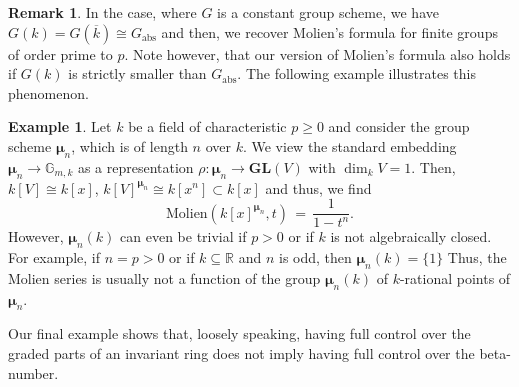 \documentclass[reqno]{amsart}
\newcommand{\RR}{{\mathbb{R}}}
\newcommand{\GG}{{\mathbb{G}}}
\newcommand{\GL}{{\mathbf{GL}}}
\newcommand{\bmu}{\boldsymbol{\mu}}
\theoremstyle{definition}
\newtheorem{Example}[Definition]{Example}
\newtheorem{Remark}[Definition]{Remark}
\theoremstyle{plain}
\begin{document}
\begin{Remark}
\label{rem: molien}
In the case, where $G$ is a constant group scheme,
we have $G(k)=G(\overline{k})\cong G_{\mathrm{abs}}$ and then, 
we recover Molien's formula for finite groups of order prime to $p$.
Note however, that our version of Molien's formula also holds
if $G(k)$ is strictly smaller than $G_{\mathrm{abs}}$.
The following example illustrates this phenomenon.
\end{Remark}

\begin{Example}
\label{ex: molien}
Let $k$ be a field of characteristic $p\geq0$
and consider the group scheme $\bmu_n$, which is of length $n$ over $k$.
We view the standard embedding $\bmu_n\to\GG_{m,k}$
as a representation $\rho:\bmu_n\to\GL(V)$ with $\dim_kV=1$.
Then, $k[V]\cong k[x]$, $k[V]^{\bmu_n}\cong k[x^n]\subset k[x]$ 
and thus, we find
$$
\mathrm{Molien}\left(k[x]^{\bmu_n},t\right) \,=\,\frac{1}{1-t^n}.
$$
However, $\bmu_n(k)$ can even be trivial 
if $p>0$ or if $k$ is not algebraically closed.
For example, if $n=p>0$ or if $k\subseteq\RR$ and $n$ is odd, then $\bmu_n(k)=\{1\}$
Thus, the Molien series is usually not a function of the group $\bmu_n(k)$
of $k$-rational points of $\bmu_n$. 
\end{Example}

Our final example shows that, loosely speaking, having full control over
the graded parts of an invariant ring does not imply having full control over 
the beta-number.
\end{document}
